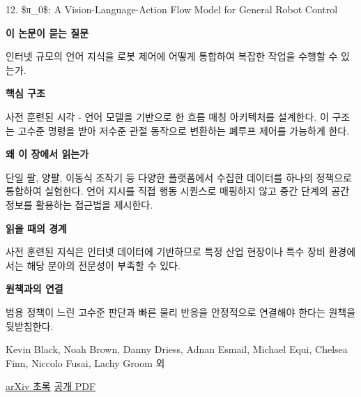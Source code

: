 \documentclass[11pt,openany]{book}
\begin{document}
\begin{termcard}{12. \$π\_0\$: A Vision-Language-Action Flow Model for General Robot Control}

\par

\medskip

{\sffamily\bfseries\color{deepblue} 이 논문이 묻는 질문}\par

인터넷 규모의 언어 지식을 로봇 제어에 어떻게 통합하여 복잡한 작업을 수행할 수 있는가.

\smallskip

{\sffamily\bfseries\color{deepblue} 핵심 구조}\par

사전 훈련된 시각 - 언어 모델을 기반으로 한 흐름 매칭 아키텍처를 설계한다. 이 구조는 고수준 명령을 받아 저수준 관절 동작으로 변환하는 폐루프 제어를 가능하게 한다.

\smallskip

{\sffamily\bfseries\color{deepblue} 왜 이 장에서 읽는가}\par

단일 팔, 양팔, 이동식 조작기 등 다양한 플랫폼에서 수집한 데이터를 하나의 정책으로 통합하여 실험한다. 언어 지시를 직접 행동 시퀀스로 매핑하지 않고 중간 단계의 공간 정보를 활용하는 접근법을 제시한다.

\smallskip

{\sffamily\bfseries\color{coral} 읽을 때의 경계}\par

사전 훈련된 지식은 인터넷 데이터에 기반하므로 특정 산업 현장이나 특수 장비 환경에서는 해당 분야의 전문성이 부족할 수 있다.

\smallskip

{\sffamily\bfseries\color{teal} 원책과의 연결}\par

범용 정책이 느린 고수준 판단과 빠른 물리 반응을 안정적으로 연결해야 한다는 원책을 뒷받침한다.

\medskip

{\footnotesize\color{muted} Kevin Black, Noah Brown, Danny Driess, Adnan Esmail, Michael Equi, Chelsea Finn, Niccolo Fusai, Lachy Groom 외\par

\href{https://arxiv.org/abs/2410.24164}{arXiv 초록} \quad \href{https://arxiv.org/pdf/2410.24164}{공개 PDF}\par}

\end{termcard}
\end{document}
